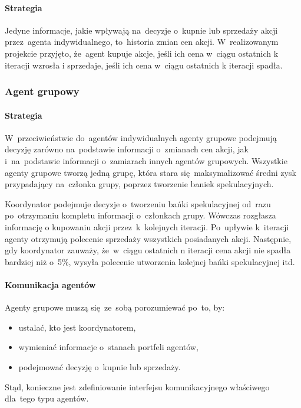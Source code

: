 \documentclass[11pt,a4paper]{article}
\begin{document}
\paragraph{Strategia}
Jedyne informacje, jakie wpływają na~decyzje o~kupnie lub sprzedaży akcji przez~agenta indywidualnego, to~historia zmian cen akcji. W~realizowanym projekcie przyjęto, że~agent kupuje akcje, jeśli ich cena w~ciągu ostatnich k iteracji wzrosła i sprzedaje, jeśli ich cena w~ciągu ostatnich k iteracji spadła.

\subsubsection{Agent grupowy}
\paragraph{Strategia}
W~przeciwieństwie do~agentów indywidualnych agenty grupowe podejmują decyzję zarówno na~podstawie informacji o~zmianach cen akcji, jak i~na~podstawie informacji o~zamiarach innych agentów grupowych. Wszystkie agenty grupowe tworzą jedną grupę, która stara się~maksymalizować średni zysk przypadający na~członka grupy, poprzez tworzenie baniek spekulacyjnych. 

Koordynator podejmuje decyzje o~tworzeniu bańki spekulacyjnej od~razu po~otrzymaniu kompletu informacji o~członkach grupy. Wówczas rozgłasza informację o kupowaniu akcji przez~k~kolejnych iteracji. Po~upływie k~iteracji agenty otrzymują polecenie sprzedaży wszystkich posiadanych akcji. Następnie, gdy koordynator zauważy, że~w~ciągu ostatnich n iteracji cena akcji nie spadła bardziej niż o~5\%, wysyła polecenie utworzenia kolejnej bańki spekulacyjnej itd.

\paragraph{Komunikacja agentów}
Agenty grupowe muszą się~ze~sobą porozumiewać po~to, by:
\begin{itemize}
  \item ustalać, kto jest koordynatorem,
  \item wymieniać informacje o~stanach portfeli agentów,
  \item podejmować decyzję o~kupnie lub sprzedaży.
\end{itemize}

Stąd, konieczne jest zdefiniowanie interfejsu komunikacyjnego właściwego dla~tego typu agentów.
\end{document}
